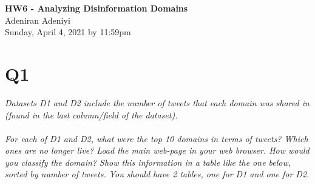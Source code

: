 \documentclass[12pt]{article}
\begin{document}
\begin{centering}
{\large\textbf{HW6 - Analyzing Disinformation Domains}}\\ %
Adeniran Adeniyi\\                     %
Sunday, April 4, 2021 by 11:59pm\\                      %
\end{centering}



\section*{Q1}
\emph{Datasets D1 and D2 include the number of tweets that each domain was shared in (found in the last column/field of the dataset).\\ \\
For each of D1 and D2, what were the top 10 domains in terms of tweets? Which ones are no longer live? Load the main web-page in your web browser. How would you classify the domain? Show this information in a table like the one below, sorted by number of tweets. You should have 2 tables, one for D1 and one for D2.}
\subsection*{\color{blue}{Answer}}

\end{document}
